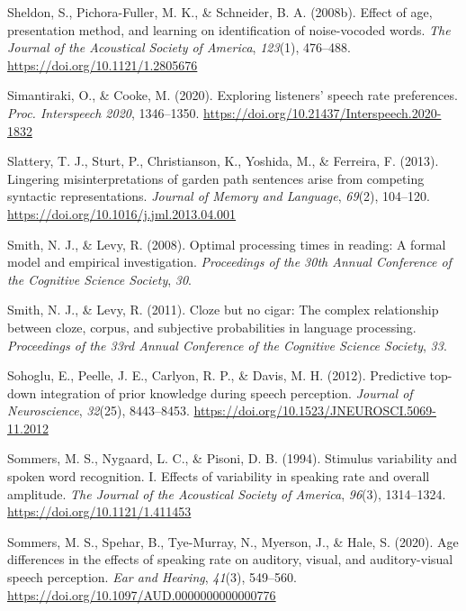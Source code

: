 \documentclass[a4paper, nobind]{templates/ociamthesis}
\newlength{\cslhangindent}
\newenvironment{CSLReferences}[2] %
 {%
  \setlength{\parindent}{0pt}
  \ifodd #1
  \let\oldpar\par
  \def\par{\hangindent=\cslhangindent\oldpar}
  \fi
  \setlength{\parskip}{1mm}
  \setlength{\baselineskip}{6mm}
 }%
 {}
\begin{document}
\begin{CSLReferences}{1}{0}
\leavevmode{}%
Sheldon, S., Pichora-Fuller, M. K., \& Schneider, B. A. (2008b). Effect of age, presentation method, and learning on identification of noise-vocoded words. \emph{The Journal of the Acoustical Society of America}, \emph{123}(1), 476--488. \url{https://doi.org/10.1121/1.2805676}

\leavevmode{}%
Simantiraki, O., \& Cooke, M. (2020). {Exploring listeners' speech rate preferences}. \emph{Proc. Interspeech 2020}, 1346--1350. \url{https://doi.org/10.21437/Interspeech.2020-1832}

\leavevmode{}%
Slattery, T. J., Sturt, P., Christianson, K., Yoshida, M., \& Ferreira, F. (2013). Lingering misinterpretations of garden path sentences arise from competing syntactic representations. \emph{Journal of Memory and Language}, \emph{69}(2), 104--120. \url{https://doi.org/10.1016/j.jml.2013.04.001}

\leavevmode{}%
Smith, N. J., \& Levy, R. (2008). Optimal processing times in reading: A formal model and empirical investigation. \emph{Proceedings of the 30th Annual Conference of the Cognitive Science Society}, \emph{30}.

\leavevmode{}%
Smith, N. J., \& Levy, R. (2011). Cloze but no cigar: The complex relationship between cloze, corpus, and subjective probabilities in language processing. \emph{Proceedings of the 33rd Annual Conference of the Cognitive Science Society}, \emph{33}.

\leavevmode{}%
Sohoglu, E., Peelle, J. E., Carlyon, R. P., \& Davis, M. H. (2012). {Predictive top-down integration of prior knowledge during speech perception}. \emph{Journal of Neuroscience}, \emph{32}(25), 8443--8453. \url{https://doi.org/10.1523/JNEUROSCI.5069-11.2012}

\leavevmode{}%
Sommers, M. S., Nygaard, L. C., \& Pisoni, D. B. (1994). Stimulus variability and spoken word recognition. I. Effects of variability in speaking rate and overall amplitude. \emph{The Journal of the Acoustical Society of America}, \emph{96}(3), 1314--1324. \url{https://doi.org/10.1121/1.411453}

\leavevmode{}%
Sommers, M. S., Spehar, B., Tye-Murray, N., Myerson, J., \& Hale, S. (2020). Age differences in the effects of speaking rate on auditory, visual, and auditory-visual speech perception. \emph{Ear and Hearing}, \emph{41}(3), 549--560. \url{https://doi.org/10.1097/AUD.0000000000000776}


\end{CSLReferences}
\end{document}
